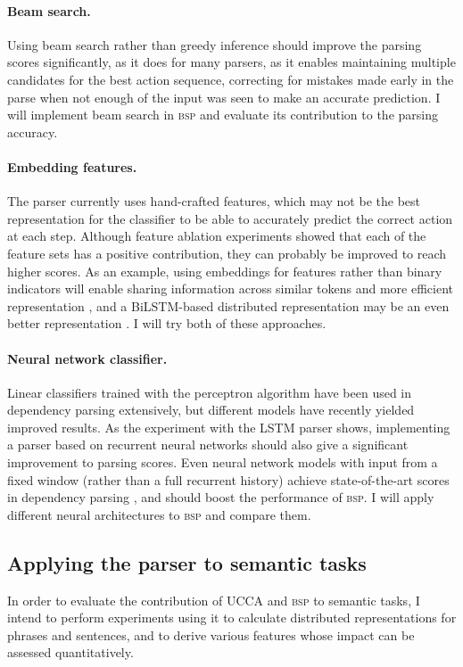 \documentclass[12pt]{article}
\begin{document}
\paragraph{Beam search.}
Using beam search rather than greedy inference should improve the parsing
scores significantly, as it does for many parsers, as it enables maintaining multiple candidates
for the best action sequence, correcting for mistakes made early in the parse when
not enough of the input was seen to make an accurate prediction.
I will implement beam search in \textsc{bsp} and evaluate its contribution to the parsing accuracy.

\paragraph{Embedding features.}
The parser currently uses hand-crafted features, which may not be the best
representation for the classifier to be able to accurately predict the correct action
at each step. Although feature ablation experiments showed that each of the feature
sets has a positive contribution, they can probably be improved to reach higher scores.
As an example, using embeddings for features rather than binary
indicators will enable sharing information across similar tokens and more efficient
representation \cite{chen2014fast},
and a BiLSTM-based distributed representation may be an even better representation
\cite{kiperwasser2016simple}.
I will try both of these approaches.

\paragraph{Neural network classifier.}
Linear classifiers trained with the perceptron algorithm have been used in
dependency parsing extensively, but different models have recently yielded improved
results.
As the experiment with the LSTM parser shows, implementing a parser
based on recurrent neural networks should also give a significant improvement to
parsing scores.
Even neural network models with input from a fixed window (rather than a full recurrent
history) achieve state-of-the-art scores in dependency parsing
\cite{chen2014fast,andor2016globally}, and should boost the performance of \textsc{bsp}.
I will apply different neural architectures to \textsc{bsp} and compare them.

\subsection{Applying the parser to semantic tasks}\label{sec:semantic_tasks}
In order to evaluate the contribution of UCCA and \textsc{bsp} to semantic tasks,
I intend to perform experiments using it to calculate distributed representations for
phrases and sentences, and to derive various features whose impact can be assessed quantitatively.
\end{document}
